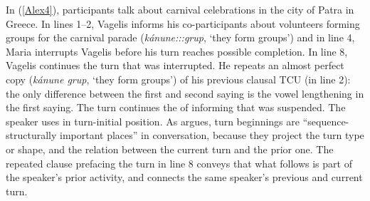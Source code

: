\documentclass[output=paper]{LSP/langsci}
\begin{document}
In (\ref{Alex4}), participants talk about carnival celebrations in the city of Patra in Greece. In lines 1--2, Vagelis informs his co-participants about volunteers forming groups for the carnival parade (\textit{kánune:::grup}, `they form groups') and in line 4, Maria interrupts Vagelis before his turn reaches possible completion. In line 8, Vagelis continues the turn that was interrupted. He repeats an almost perfect copy (\textit{kánune grup}, `they form groups') of his previous clausal TCU (in line 2): the only difference between the first and second saying is the vowel lengthening in the first saying. The turn continues the  of informing that was suspended. The speaker uses  in turn-initial position. As \citet[][72]{schegloff87} argues, turn beginnings are ``sequence-structurally important places'' in conversation, because they project the turn type or shape, and the relation between the current turn and the prior one. The repeated clause prefacing the turn in line 8 conveys that what follows is part of the speaker’s prior activity, and connects the same speaker’s previous and current turn.
\end{document}
